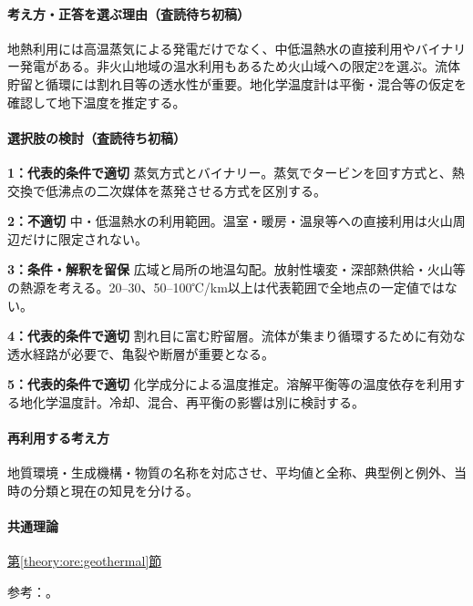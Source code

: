 \paragraph{考え方・正答を選ぶ理由（査読待ち初稿）} 地熱利用には高温蒸気による発電だけでなく、中低温熱水の直接利用やバイナリー発電がある。非火山地域の温水利用もあるため火山域への限定2を選ぶ。流体貯留と循環には割れ目等の透水性が重要。地化学温度計は平衡・混合等の仮定を確認して地下温度を推定する。

\paragraph{選択肢の検討（査読待ち初稿）}\mbox{}\par

\noindent\textbf{1：代表的条件で適切} 蒸気方式とバイナリー。蒸気でタービンを回す方式と、熱交換で低沸点の二次媒体を蒸発させる方式を区別する。\par

\noindent\textbf{2：不適切} 中・低温熱水の利用範囲。温室・暖房・温泉等への直接利用は火山周辺だけに限定されない。\par

\noindent\textbf{3：条件・解釈を留保} 広域と局所の地温勾配。放射性壊変・深部熱供給・火山等の熱源を考える。20–30、50–100℃/km以上は代表範囲で全地点の一定値ではない。\par

\noindent\textbf{4：代表的条件で適切} 割れ目に富む貯留層。流体が集まり循環するために有効な透水経路が必要で、亀裂や断層が重要となる。\par

\noindent\textbf{5：代表的条件で適切} 化学成分による温度推定。溶解平衡等の温度依存を利用する地化学温度計。冷却、混合、再平衡の影響は別に検討する。\par

\paragraph{再利用する考え方} 地質環境・生成機構・物質の名称を対応させ、平均値と全称、典型例と例外、当時の分類と現在の知見を分ける。

\paragraph{共通理論} \hyperref[theory:ore:geothermal]{第\ref*{theory:ore:geothermal}節}

\par 参考：\cite{ore50_geothermal_ref,ore50_reservoir_ref}。

